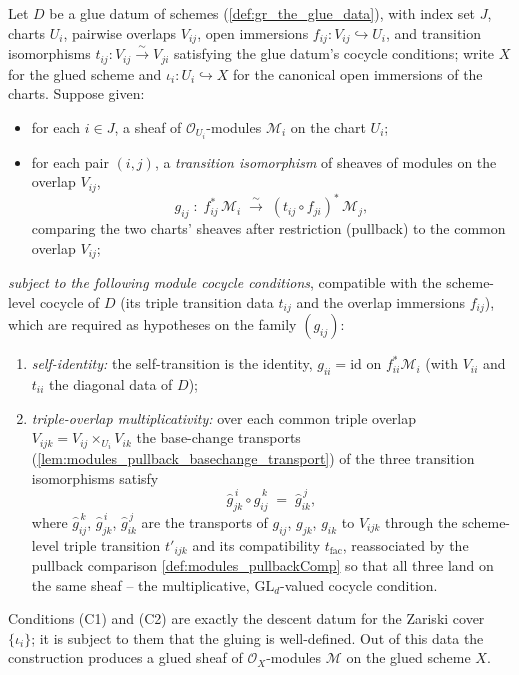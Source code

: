 \begin{definition}\leanok
  \label{def:scheme_modules_glue}
  Let \(D\) be a glue datum of schemes (\cref{def:gr_the_glue_data}), with index set \(J\), charts \(U_i\),
  pairwise overlaps \(V_{ij}\), open immersions
  \(f_{ij} : V_{ij} \hookrightarrow U_i\), and transition isomorphisms
  \(t_{ij} : V_{ij} \xrightarrow{\sim} V_{ji}\) satisfying the glue datum's
  cocycle conditions; write \(X\) for the glued scheme and
  \(\iota_i : U_i \hookrightarrow X\) for the canonical open immersions of the
  charts. Suppose given:
  \begin{itemize}
    \item for each \(i \in J\), a sheaf of \(\mathcal{O}_{U_i}\)-modules \(\mathcal{M}_i\) on the chart \(U_i\);
    \item for each pair \((i,j)\), a \emph{transition isomorphism} of sheaves of
      modules on the overlap \(V_{ij}\),
      \[
        g_{ij} \;:\; f_{ij}^{*}\,\mathcal{M}_i
          \;\xrightarrow{\ \sim\ }\;
        (t_{ij} \circ f_{ji})^{*}\,\mathcal{M}_j,
      \]
      comparing the two charts' sheaves after restriction (pullback) to the
      common overlap \(V_{ij}\);
  \end{itemize}
  \emph{subject to the following module cocycle conditions}, compatible with the
  scheme-level cocycle of \(D\) (its triple transition data \(t_{ij}\) and the
  overlap immersions \(f_{ij}\)), which are required as hypotheses on the family
  \((g_{ij})\):
  \begin{enumerate}
    \item[(C1)] \emph{self-identity:} the self-transition is the identity,
      \(g_{ii} = \mathrm{id}\) on \(f_{ii}^{*}\mathcal{M}_i\) (with
      \(V_{ii}\) and \(t_{ii}\) the diagonal data of \(D\));
    \item[(C2)] \emph{triple-overlap multiplicativity:} over each common triple
      overlap \(V_{ijk} = V_{ij} \times_{U_i} V_{ik}\) the base-change transports
      (\cref{lem:modules_pullback_basechange_transport}) of the three transition
      isomorphisms satisfy
      \[
        \widehat{g}_{jk}^{\,i} \circ \widehat{g}_{ij}^{\,k}
          \;=\; \widehat{g}_{ik}^{\,j},
      \]
      where \(\widehat{g}_{ij}^{\,k}\), \(\widehat{g}_{jk}^{\,i}\),
      \(\widehat{g}_{ik}^{\,j}\) are the transports of \(g_{ij}\), \(g_{jk}\),
      \(g_{ik}\) to \(V_{ijk}\) through the scheme-level triple transition
      \(t'_{ijk}\) and its compatibility \(t_{\mathrm{fac}}\), reassociated by the
      pullback comparison \cref{def:modules_pullbackComp} so that all three land on
      the same sheaf -- the multiplicative, \(\mathrm{GL}_d\)-valued cocycle
      condition.
  \end{enumerate}
  Conditions (C1) and (C2) are exactly the descent datum for the Zariski cover
  \(\{\iota_i\}\); it is subject to them that the gluing is well-defined. Out of this
  data the construction produces a glued sheaf of \(\mathcal{O}_X\)-modules
  \(\mathcal{M}\) on the glued scheme \(X\).


\end{definition}

